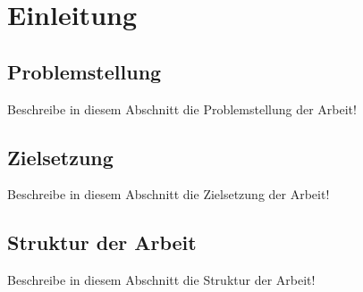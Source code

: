 %
%
%
%
\chapter{Einleitung}
\label{cha:einleitung}


\section{Problemstellung}
\label{sec:einleitung:problemstellung}
Beschreibe in diesem Abschnitt die Problemstellung der Arbeit!

\section{Zielsetzung}
\label{sec:einleitung:zielsetzung}
Beschreibe in diesem Abschnitt die Zielsetzung der Arbeit!

\section{Struktur der Arbeit}
\label{sec:einleitung:struktur}
Beschreibe in diesem Abschnitt die Struktur der Arbeit!
